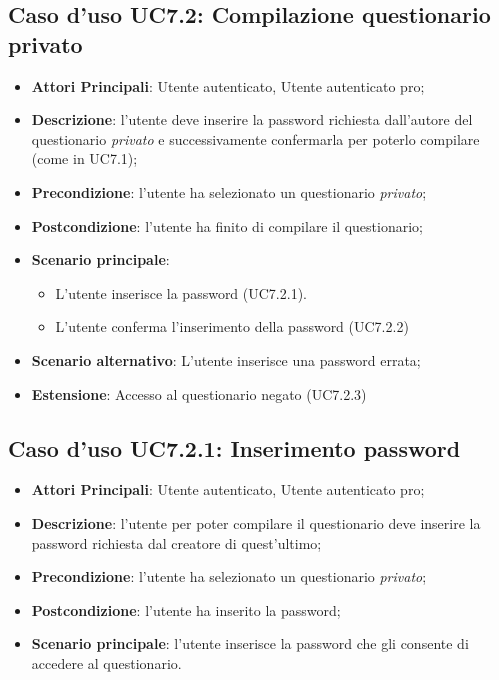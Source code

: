 \subsection{Caso d'uso UC7.2: Compilazione questionario privato}
\begin{itemize}
\item\textbf{Attori Principali}: Utente autenticato, Utente autenticato pro;
\item\textbf{Descrizione}: l'utente deve inserire la password richiesta dall'autore del questionario \textit{privato} e successivamente confermarla per poterlo compilare (come in UC7.1);
\item\textbf{Precondizione}: l'utente ha selezionato un questionario \textit{privato};
\item\textbf{Postcondizione}: l'utente ha finito di compilare il questionario;
\item\textbf{Scenario principale}:
\begin{itemize}
\item L'utente inserisce la password (UC7.2.1).
\item L'utente conferma l'inserimento della password (UC7.2.2)
\end{itemize}
\item\textbf{Scenario alternativo}: L'utente inserisce una password errata;
\item\textbf{Estensione}: Accesso al questionario negato (UC7.2.3)
\end{itemize}

\subsection{Caso d'uso UC7.2.1: Inserimento password}
\begin{itemize}
\item\textbf{Attori Principali}: Utente autenticato, Utente autenticato pro;
\item\textbf{Descrizione}: l'utente per poter compilare il questionario deve inserire la password richiesta dal creatore di quest'ultimo;
\item\textbf{Precondizione}: l'utente ha selezionato un questionario \textit{privato};
\item\textbf{Postcondizione}: l'utente ha inserito la password;
\item\textbf{Scenario principale}: l'utente inserisce la password che gli consente di accedere al questionario.
\end{itemize}

